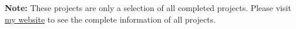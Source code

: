\begin{cvparagraph}
   
\end{cvparagraph}
\begin{cvparagraph}
   
\end{cvparagraph}


\begin{cvparagraph}

\textbf{Note: }These projects are only a selection of all completed projects. Please visit \underline{\href{https://peymanfarahani.herokuapp.com}{my website}} to see the complete information of all projects.
\end{cvparagraph}